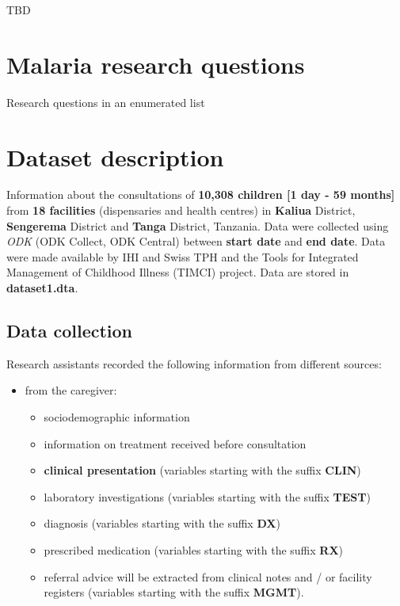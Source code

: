 \documentclass[
  letterpaper,
  DIV=11,
  numbers=noendperiod]{scrreprt}
\providecommand{\tightlist}{%
  \setlength{\itemsep}{0pt}\setlength{\parskip}{0pt}}\usepackage{longtable,booktabs,array}
\begin{document}
TBD


\hypertarget{malaria-research-questions}{%
\chapter{Malaria research questions}\label{malaria-research-questions}}

Research questions in an enumerated list


\hypertarget{dataset-description}{%
\chapter{Dataset description}\label{dataset-description}}

Information about the consultations of \textbf{10,308 children {[}1 day
- 59 months{]}} from \textbf{18 facilities} (dispensaries and health
centres) in \textbf{Kaliua} District, \textbf{Sengerema} District and
\textbf{Tanga} District, Tanzania. Data were collected using \emph{ODK}
(ODK Collect, ODK Central) between \textbf{start date} and \textbf{end
date}. Data were made available by IHI and Swiss TPH and the Tools for
Integrated Management of Childhood Illness (TIMCI) project. Data are
stored in \textbf{dataset1.dta}.

\hypertarget{data-collection}{%
\section{Data collection}\label{data-collection}}

Research assistants recorded the following information from different
sources:

\begin{itemize}
\tightlist
\item
  from the caregiver:

  \begin{itemize}
  \tightlist
  \item
    sociodemographic information
  \item
    information on treatment received before consultation
  \item
    \textbf{clinical presentation} (variables starting with the suffix
    \textbf{CLIN})
  \item
    laboratory investigations (variables starting with the suffix
    \textbf{TEST})
  \item
    diagnosis (variables starting with the suffix \textbf{DX})
  \item
    prescribed medication (variables starting with the suffix
    \textbf{RX})
  \item
    referral advice will be extracted from clinical notes and / or
    facility registers (variables starting with the suffix
    \textbf{MGMT}).
  \end{itemize}
\end{itemize}
\end{document}
